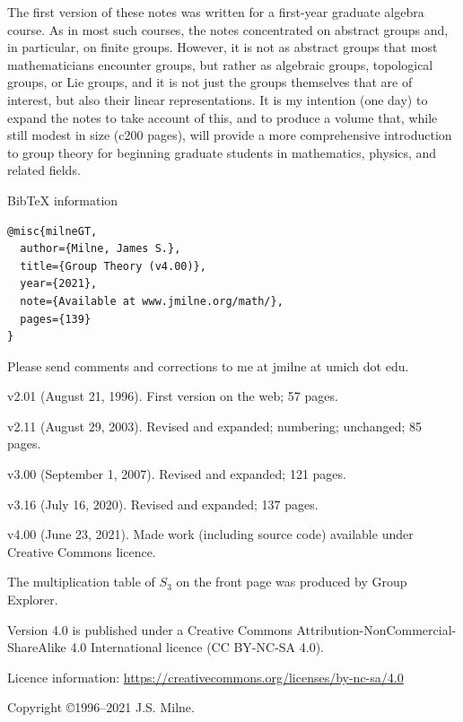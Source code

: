 \documentclass[a4paper,11pt,final]{memoir}%
\theoremstyle{nonumberplain}
\begin{document}
\noindent The first version of these notes was written for a first-year
graduate algebra course. As in most such courses, the notes concentrated on
abstract groups and, in particular, on finite groups. However, it is not as
abstract groups that most mathematicians encounter groups, but rather as
algebraic groups, topological groups, or Lie groups, and it is not just the
groups themselves that are of interest, but also their linear representations.
It is my intention (one day) to expand the notes to take account of this, and
to produce a volume that, while still modest in size (c200 pages), will
provide a more comprehensive introduction to group theory for beginning
graduate students in mathematics, physics, and related fields.

\vfill \noindent BibTeX information
\begin{verbatim}
@misc{milneGT,
  author={Milne, James S.},
  title={Group Theory (v4.00)},
  year={2021},
  note={Available at www.jmilne.org/math/},
  pages={139}
}
\end{verbatim}

\vfill


\noindent Please send comments and corrections to me at jmilne at umich dot edu.

\noindent v2.01 (August 21, 1996). First version on the web; 57 pages.

\noindent v2.11 (August 29, 2003). Revised and expanded; numbering; unchanged; 85 pages.

\noindent v3.00 (September 1, 2007). Revised and expanded; 121 pages.

\noindent v3.16 (July 16, 2020). Revised and expanded; 137 pages.

\noindent v4.00 (June 23, 2021). Made work (including source code) available
under Creative Commons licence.
\vfill


\noindent The multiplication table of $S_{3}$ on the front page was produced
by Group Explorer. \vfill

\noindent Version 4.0 is published under a Creative Commons
Attribution-NonCommercial-ShareAlike 4.0 International licence
(CC BY-NC-SA 4.0).

\bigskip

\noindent Licence information:
\href{https://creativecommons.org/licenses/by-nc-sa/4.0/}{https://creativecommons.org/licenses/by-nc-sa/4.0}

\bigskip

\noindent Copyright \copyright 1996--2021 J.S. Milne.
\end{document}

